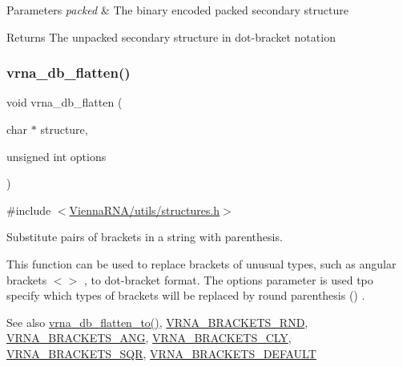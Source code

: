 \begin{DoxyParams}{Parameters}
{\em packed} & The binary encoded packed secondary structure \\
\hline
\end{DoxyParams}
\begin{DoxyReturn}{Returns}
The unpacked secondary structure in dot-\/bracket notation 
\end{DoxyReturn}
\mbox{\label{group__struct__utils__dot__bracket_gafd1304f5a86e2e3f1425e725cde44fa2}} 
\subsubsection{\texorpdfstring{vrna\_db\_flatten()}{vrna\_db\_flatten()}}
{\footnotesize\ttfamily void vrna\+\_\+db\+\_\+flatten (\begin{DoxyParamCaption}\item[{char $\ast$}]{structure,  }\item[{unsigned int}]{options }\end{DoxyParamCaption})}



{\ttfamily \#include $<$\mbox{\hyperlink{utils_2structures_8h}{Vienna\+R\+N\+A/utils/structures.\+h}}$>$}



Substitute pairs of brackets in a string with parenthesis. 

This function can be used to replace brackets of unusual types, such as angular brackets {\ttfamily $<$$>$} , to dot-\/bracket format. The {\ttfamily options} parameter is used tpo specify which types of brackets will be replaced by round parenthesis {\ttfamily }() .

\begin{DoxySeeAlso}{See also}
\mbox{\hyperlink{group__struct__utils__dot__bracket_ga690425199c8b71545e7196e3af1436f8}{vrna\+\_\+db\+\_\+flatten\+\_\+to()}}, \mbox{\hyperlink{group__struct__utils__dot__bracket_gac92d5fa7c6625bce2670ece510a24fbd}{V\+R\+N\+A\+\_\+\+B\+R\+A\+C\+K\+E\+T\+S\+\_\+\+R\+ND}}, \mbox{\hyperlink{group__struct__utils__dot__bracket_ga863e03f7f73f10fc9bbcbefbdda4bec8}{V\+R\+N\+A\+\_\+\+B\+R\+A\+C\+K\+E\+T\+S\+\_\+\+A\+NG}}, \mbox{\hyperlink{group__struct__utils__dot__bracket_gaf41be40e79cb756c4e0bb8edb4d803d2}{V\+R\+N\+A\+\_\+\+B\+R\+A\+C\+K\+E\+T\+S\+\_\+\+C\+LY}}, \mbox{\hyperlink{group__struct__utils__dot__bracket_ga60525d61d7496eeea490a37f3d6bf757}{V\+R\+N\+A\+\_\+\+B\+R\+A\+C\+K\+E\+T\+S\+\_\+\+S\+QR}}, \mbox{\hyperlink{group__struct__utils__dot__bracket_ga559ebf76b1b289f85309f4206e99aa1a}{V\+R\+N\+A\+\_\+\+B\+R\+A\+C\+K\+E\+T\+S\+\_\+\+D\+E\+F\+A\+U\+LT}}
\end{DoxySeeAlso}

